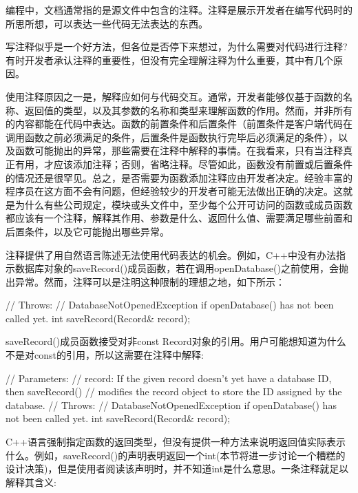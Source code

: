 
编程中，文档通常指的是源文件中包含的注释。注释是展示开发者在编写代码时的所思所想，可以表达一些代码无法表达的东西。


写注释似乎是一个好方法，但各位是否停下来想过，为什么需要对代码进行注释?有时开发者承认注释的重要性，但没有完全理解注释为什么重要，其中有几个原因。


使用注释原因之一是，解释应如何与代码交互。通常，开发者能够仅基于函数的名称、返回值的类型，以及其参数的名称和类型来理解函数的作用。然而，并非所有的内容都能在代码中表达。函数的前置条件和后置条件（前置条件是客户端代码在调用函数之前必须满足的条件，后置条件是函数执行完毕后必须满足的条件），以及函数可能抛出的异常，那些需要在注释中解释的事情。在我看来，只有当注释真正有用，才应该添加注释；否则，省略注释。尽管如此，函数没有前置或后置条件的情况还是很罕见。总之，是否需要为函数添加注释应由开发者决定。经验丰富的程序员在这方面不会有问题，但经验较少的开发者可能无法做出正确的决定。这就是为什么有些公司规定，模块或头文件中，至少每个公开可访问的函数或成员函数都应该有一个注释，解释其作用、参数是什么、返回什么值、需要满足哪些前置和后置条件，以及它可能抛出哪些异常。

注释提供了用自然语言陈述无法使用代码表达的机会。例如，C++中没有办法指示数据库对象的saveRecord()成员函数，若在调用openDatabase()之前使用，会抛出异常。然而，注释可以是注明这种限制的理想之地，如下所示：

\begin{cpp}
// Throws:
//    DatabaseNotOpenedException if openDatabase() has not been called yet.
int saveRecord(Record& record);
\end{cpp}

saveRecord()成员函数接受对非const Record对象的引用。用户可能想知道为什么不是对const的引用，所以这需要在注释中解释:

\begin{cpp}
// Parameters:
//    record: If the given record doesn't yet have a database ID, then saveRecord()
//    modifies the record object to store the ID assigned by the database.
// Throws:
//    DatabaseNotOpenedException if openDatabase() has not been called yet.
int saveRecord(Record& record);
\end{cpp}

C++语言强制指定函数的返回类型，但没有提供一种方法来说明返回值实际表示什么。例如，saveRecord()的声明表明返回一个int(本节将进一步讨论一个糟糕的设计决策)，但是使用者阅读该声明时，并不知道int是什么意思。一条注释就足以解释其含义:

